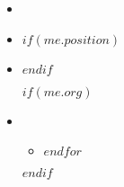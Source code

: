 \begin{itemize}[itemsep=5pt]

  \item {}

  \item {} \quad {}

  $if(me.position)$\item {}$endif$

  $if(me.org)$\item\vspace{-3pt}
  \begin{itemize}[itemsep=0pt]
    $for(me.org)$

    \item {}
    $endfor$

  \end{itemize}
  $endif$
\end{itemize}
